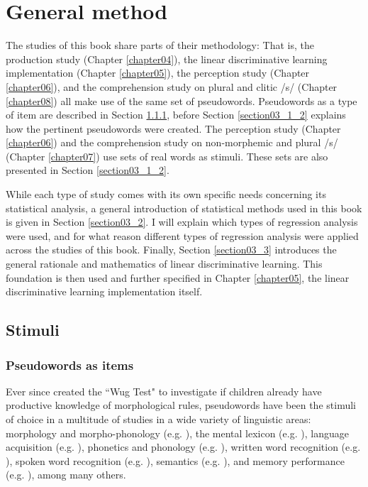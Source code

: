 \chapter{General method}\label{chapter03}

The studies of this book share parts of their methodology: That is, the production study (Chapter \ref{chapter04}), the linear discriminative learning implementation (Chapter \ref{chapter05}), the perception study (Chapter \ref{chapter06}), and the comprehension study on plural and clitic /s/ (Chapter \ref{chapter08}) all make use of the same set of pseudowords. Pseudowords as a type of item are described in Section \ref{section03_1_1}, before Section \ref{section03_1_2} explains how the pertinent pseudowords were created. The perception study (Chapter \ref{chapter06}) and the comprehension study on non-morphemic and plural /s/ (Chapter \ref{chapter07}) use sets of real words as stimuli. These sets are also presented in Section \ref{section03_1_2}.

While each type of study comes with its own specific needs concerning its statistical analysis, a general introduction of statistical methods used in this book is given in Section \ref{section03_2}. I will explain which types of regression analysis were used, and for what reason different types of regression analysis were applied across the studies of this book.
Finally, Section \ref{section03_3} introduces the general rationale and mathematics of linear discriminative learning. This foundation is then used and further specified in Chapter \ref{chapter05}, the linear discriminative learning implementation itself.

\section{Stimuli}\label{section03_1}

\subsection{Pseudowords as items}\label{section03_1_1}

Ever since \citet{Berko1958} created the ``Wug Test" to investigate if children already have productive knowledge of morphological rules, pseudowords have been the stimuli of choice in a multitude of studies in a wide variety of linguistic areas: morphology and morpho-phonology (e.g. \cite{Albright2002, Albright2003, Pierrehumbert2006, Dabrowska2008, Kraemer2009, Kawahara2012, Gouskova2013}), the mental lexicon (e.g. \cite{Rubenstein1970, Anshen1988, Prasada1993, Vitevitch1998, Eddington2000, Shatzman2006pseudo, Meunier2007}), language acquisition (e.g. \cite{Dollaghan1985, Singson2000, Friedrich2005, Vijver2014}), phonetics and phonology (e.g. \cite{Turcsan2015, Schmitz2018}), written word recognition (e.g. \cite{Burani1999, McKay2008}), spoken word recognition (e.g. \cite{Marslen1984}), semantics (e.g. \cite{Ozubko2011}), and memory performance (e.g. \cite{Hulme1995}), among many others.

